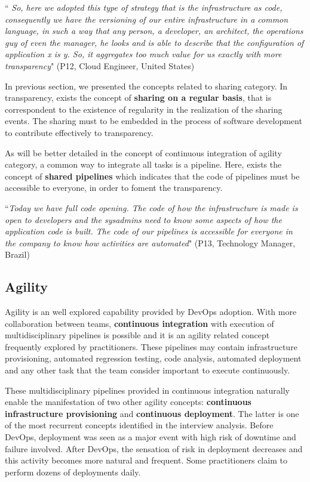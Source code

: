 \begin{mq}
``\emph{
So, here we adopted this type of strategy that is the infrastructure as code,
consequently we have the versioning of our entire infrastructure in a common
language, in such a way that any person, a developer, an architect, the
operations guy of even the manager, he looks and is able to describe that the
configuration of application x is y. So, it aggregates too much value for us
exactly with more transparency}" (P12, Cloud Engineer, United States)
\end{mq}

In previous section, we presented the concepts related to sharing category. In
transparency, exists the concept of \textbf{sharing on a regular basis}, that
is correspondent to the existence of regularity in the realization of the
sharing events. The sharing must to be embedded in the process of software
development to contribute effectively to transparency.

As will be better detailed in the concept of continuous integration of agility
category, a common way to integrate all tasks is a pipeline. Here, exists the
concept of \textbf{shared pipelines} which indicates that the code of pipelines
must be accessible to everyone, in order to foment the transparency.

\begin{mq}
``\emph{Today we have full code opening. The code of how the infrastructure is
made is open to developers and the sysadmins need to know some aspects of how 
the application code is built. The code of our pipelines is accessible for
everyone in the company to know how activities are automated}" (P13, Technology
Manager, Brazil)
\end{mq}

\subsection{Agility}

Agility is an well explored capability provided by DevOps adoption. With more
collaboration between teams, \textbf{continuous integration} with execution of
multidisciplinary pipelines is possible and it is an agility related concept
frequently explored by practitioners. These pipelines may contain
infrastructure provisioning, automated regression testing, code analysis,
automated deployment and any other task that the team consider important to
execute continuously.

These multidisciplinary pipelines provided in continuous integration naturally
enable the manifestation of two other agility concepts: \textbf{continuous
infrastructure provisioning} and \textbf{continuous deployment}. The latter is
one of the most recurrent concepts identified in the interview analysis. Before
DevOps, deployment was seen as a major event with high risk of downtime and
failure involved. After DevOps, the sensation of risk in deployment decreases
and this activity becomes more natural and frequent. Some practitioners claim
to perform dozens of deployments daily.

